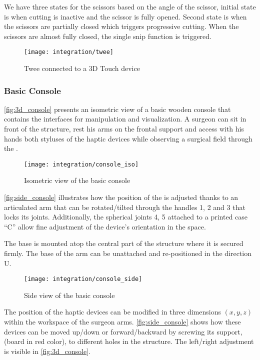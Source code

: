 We have three states for the scissors based on the angle of the scissor, initial state is when cutting is inactive and the scissor is fully opened. Second state is when the scissors are partially closed which triggers progressive cutting. When the scissors are almost fully closed, the single snip function is triggered.

\begin{figure}
  \centering
  \texttt{[image: integration/twee]}
  \caption{Twee connected to a 3D Touch device}
  \label{fig:twee}
\end{figure}

\subsubsection{Basic Console}
\autoref{fig:3d_console} presents an isometric view of a basic wooden console that contains the interfaces for manipulation and visualization. A surgeon can sit in front of the structure, rest his arms on the frontal support and access with his hands both styluses of the haptic devices while observing a surgical field through the .

\begin{figure}
  \centering%
  \texttt{[image: integration/console\_iso]}
  \caption{Isometric view of the basic console}
  \label{fig:3d_console}
\end{figure}

\autoref{fig:side_console} illustrates how the position of the  is adjusted thanks to an articulated arm that can be rotated/tilted through the handles 1, 2 and 3 that locks its joints. Additionally, the spherical joints 4, 5 attached to a  printed case \enquote{C} allow fine adjustment of the device's orientation in the space.

The base is mounted atop the central part of the structure where it is secured firmly. The base of the arm can be unattached and re-positioned in the direction U.

\begin{figure}
  \centering
  \texttt{[image: integration/console\_side]}
  \caption{Side view of the basic console}
  \label{fig:side_console}
\end{figure}

The position of the haptic devices can be modified in three dimensions $(x, y, z)$ within the workspace of the surgeon arms. \autoref{fig:side_console} shows how these devices can be moved up/down or forward/backward by screwing its support, (board in red color), to different holes in the structure. The left/right adjustment is visible in \autoref{fig:3d_console}.

